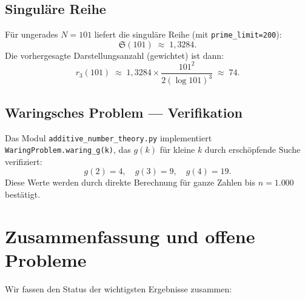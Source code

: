 \documentclass[12pt,a4paper]{amsart}
\theoremstyle{definition}
\begin{document}
\subsection{Singuläre Reihe}

F\"{u}r ungerades $N = 101$ liefert die singuläre Reihe
(mit \texttt{prime\_limit=200}):
\[
  \mathfrak{S}(101) \;\approx\; 1{,}3284.
\]
Die vorhergesagte Darstellungsanzahl (gewichtet) ist dann:
\[
  r_3(101) \;\approx\; 1{,}3284 \times \frac{101^2}{2 (\log 101)^3}
  \;\approx\; 74.
\]

\subsection{Waringsches Problem --- Verifikation}

Das Modul \texttt{additive\_number\_theory.py} implementiert
\texttt{WaringProblem.waring\_g(k)}, das $g(k)$ f\"{u}r kleine $k$
durch ersch\"{o}pfende Suche verifiziert:
\[
  g(2) = 4,\quad g(3) = 9,\quad g(4) = 19.
\]
Diese Werte werden durch direkte Berechnung f\"{u}r ganze Zahlen bis
$n = 1{.}000$ best\"{a}tigt.

\section{Zusammenfassung und offene Probleme}\label{sec:zusammenfassung}

Wir fassen den Status der wichtigsten Ergebnisse zusammen:
\end{document}

